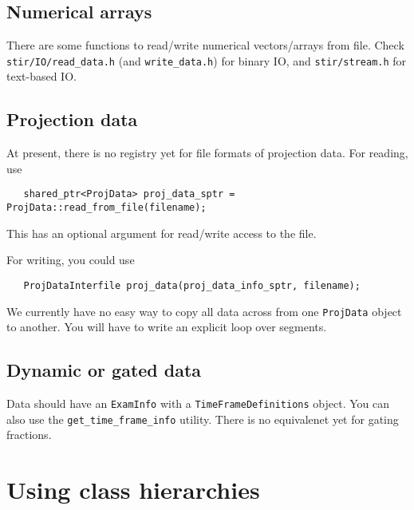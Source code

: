 \documentclass{article}
\begin{document}
\subsection{Numerical arrays}
There are some functions to read/write numerical vectors/arrays from
file. Check \texttt{stir/IO/read\_data.h} (and \texttt{write\_data.h}) for
binary IO, and \texttt{stir/stream.h} for text-based IO.

\subsection{Projection data}
At present, there is no registry yet for file formats of projection data. For reading, use
\begin{verbatim}
   shared_ptr<ProjData> proj_data_sptr = ProjData::read_from_file(filename);
\end{verbatim}
This has an optional argument for read/write access to the file.

For writing, you could use
\begin{verbatim}
   ProjDataInterfile proj_data(proj_data_info_sptr, filename);
\end{verbatim}
We currently have no easy way to copy all data across from one \texttt{ProjData}
object to another. You will have to write an explicit loop over segments.

\subsection{Dynamic or gated data}
Data should have an \texttt{ExamInfo} with a \texttt{TimeFrameDefinitions} object.
You can also use the \texttt{get\_time\_frame\_info} utility.
There is no equivalenet yet for gating fractions.


\section{
Using class hierarchies \label{sect:classhierarchies}}
\end{document}

